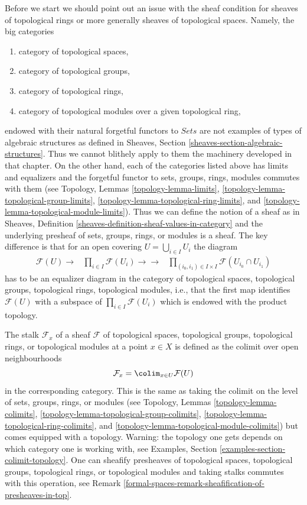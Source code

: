 \medskip\noindent
Before we start we should point out an issue with the sheaf condition
for sheaves of topological rings or more generally sheaves of topological
spaces. Namely, the big categories
\begin{enumerate}
\item category of topological spaces,
\item category of topological groups,
\item category of topological rings,
\item category of topological modules over a given topological ring,
\end{enumerate}
endowed with their natural forgetful functors to $\textit{Sets}$ are not
examples of types of algebraic structures as defined in
Sheaves, Section \ref{sheaves-section-algebraic-structures}.
Thus we cannot blithely apply to them the machinery developed in that
chapter. On the other hand, each of the categories
listed above has limits and equalizers and the forgetful functor
to sets, groups, rings, modules commutes with them
(see Topology, Lemmas \ref{topology-lemma-limits},
\ref{topology-lemma-topological-group-limits},
\ref{topology-lemma-topological-ring-limits}, and
\ref{topology-lemma-topological-module-limits}).
Thus we can define the notion of a
sheaf as in Sheaves, Definition
\ref{sheaves-definition-sheaf-values-in-category}
and the underlying presheaf of sets, groups, rings, or modules
is a sheaf. The key difference is that for an open covering
$U = \bigcup_{i \in I} U_i$ the diagram
$$
\begin{array}{ccc}\mathcal{F}(U) \longrightarrow & \prod\nolimits_{i\in I}
\mathcal{F}(U_i)
\longrightarrow\longrightarrow & \prod\nolimits_{(i_0, i_1) \in I \times I}
\mathcal{F}(U_{i_0} \cap U_{i_1})\end{array}
$$
has to be an equalizer diagram in the category of topological
spaces, topological groups, topological rings, topological modules,
i.e., that the first map identifies
$\mathcal{F}(U)$ with a subspace of $\prod_{i \in I} \mathcal{F}(U_i)$
which is endowed with the product topology.

\medskip\noindent
The stalk $\mathcal{F}_x$ of a sheaf $\mathcal{F}$
of topological spaces, topological groups, topological rings, or
topological modules at a point $x \in X$ is defined as the colimit over
open neighbourhoods
$$
\mathcal{F}_x = \colim_{x\in U} \mathcal{F}(U)
$$
in the corresponding category. This is the same as taking
the colimit on the level of sets, groups, rings, or modules
(see Topology, Lemmas \ref{topology-lemma-colimits},
\ref{topology-lemma-topological-group-colimits},
\ref{topology-lemma-topological-ring-colimits}, and
\ref{topology-lemma-topological-module-colimits})
but comes equipped with a topology. Warning:
the topology one gets depends on which category one is working with, see
Examples, Section \ref{examples-section-colimit-topology}.
One can sheafify presheaves of topological spaces,
topological groups, topological rings, or topological modules
and taking stalks commutes with this operation, see
Remark \ref{formal-spaces-remark-sheafification-of-presheaves-in-top}.

